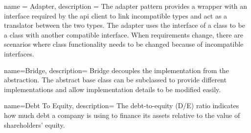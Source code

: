 

{
	name = {Adapter},
	description = {
		The adapter pattern provides a wrapper with an interface
		required by the \gls{api} client to link incompatible types and act as a
		translator between the two types. The adapter uses the interface
		of a class to be a class with another compatible interface. When
		requirements change, there are scenarios where class
		functionality needs to be changed because of incompatible
		interfaces.
	}
}

{
	name={Bridge},
	description={
			Bridge decouples the implementation from the abstraction. The
		abstract base class can be subclassed to provide different
		implementations and allow implementation details to be
		modified easily. 
	}
}


{
	name={Debt To Equity},
	description={
		The debt-to-equity (D/E) ratio indicates how much debt a company is using to finance its assets relative to the value of shareholders’ equity.
	}
}
